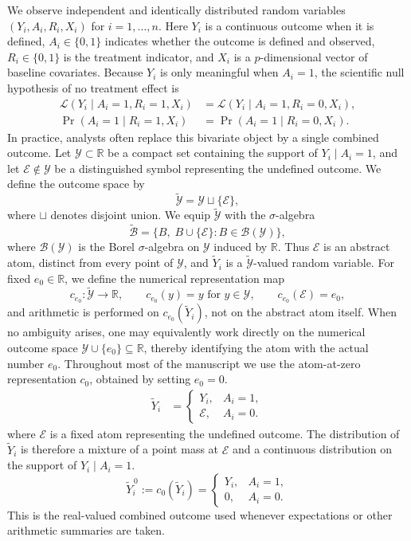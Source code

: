 \documentclass[11pt]{article}
\begin{document}
We observe independent and identically distributed random variables $(Y_i, A_i, R_i, X_i)$ for $i = 1, \ldots, n$. Here $Y_i$ is a continuous outcome when it is defined, $A_i \in \{0,1\}$ indicates whether the outcome is defined and observed, $R_i \in \{0,1\}$ is the treatment indicator, and $X_i$ is a $p$-dimensional vector of baseline covariates. Because $Y_i$ is only meaningful when $A_i = 1$, the scientific null hypothesis of no treatment effect is
\begin{align*}
  \mathcal{L}(Y_i \mid A_i = 1, R_i = 1, X_i)
  &= \mathcal{L}(Y_i \mid A_i = 1, R_i = 0, X_i),\\
  \Pr(A_i = 1 \mid R_i = 1, X_i)
  &= \Pr(A_i = 1 \mid R_i = 0, X_i).
\end{align*}
In practice, analysts often replace this bivariate object by a single combined outcome. Let $\mathcal{Y} \subset \mathbb{R}$ be a compact set containing the support of $Y_i \mid A_i = 1$, and let $\mathcal{E} \notin \mathcal{Y}$ be a distinguished symbol representing the undefined outcome. We define the outcome space by
\[
  \widetilde{\mathcal{Y}} = \mathcal{Y} \sqcup \{\mathcal{E}\},
\]
where $\sqcup$ denotes disjoint union. We equip $\widetilde{\mathcal{Y}}$ with the $\sigma$-algebra
\[
  \widetilde{\mathcal{B}} = \{B,\; B \cup \{\mathcal{E}\} : B \in \mathcal{B}(\mathcal{Y})\},
\]
where $\mathcal{B}(\mathcal{Y})$ is the Borel $\sigma$-algebra on $\mathcal{Y}$ induced by $\mathbb{R}$. Thus $\mathcal{E}$ is an abstract atom, distinct from every point of $\mathcal{Y}$, and $\widetilde{Y}_i$ is a $\widetilde{\mathcal{Y}}$-valued random variable. For fixed $e_0 \in \mathbb{R}$, we define the numerical representation map
\[
  c_{e_0}:\widetilde{\mathcal{Y}} \to \mathbb{R}, \qquad c_{e_0}(y)=y \text{ for } y \in \mathcal{Y}, \qquad c_{e_0}(\mathcal{E}) = e_0,
\]
and arithmetic is performed on $c_{e_0}(\widetilde{Y}_i)$, not on the abstract atom itself. When no ambiguity arises, one may equivalently work directly on the numerical outcome space $\mathcal{Y} \cup \{e_0\} \subseteq \mathbb{R}$, thereby identifying the atom with the actual number $e_0$. Throughout most of the manuscript we use the atom-at-zero representation $c_0$, obtained by setting $e_0 = 0$.
\begin{align}
  \widetilde{Y}_i
  &=
  \begin{cases}
    Y_i, & A_i = 1,\\
    \mathcal{E}, & A_i = 0.
  \end{cases}\label{eq:combinedOutcome}
\end{align}
where $\mathcal{E}$ is a fixed atom representing the undefined outcome. The distribution of $\widetilde{Y}_i$ is therefore a mixture of a point mass at $\mathcal{E}$ and a continuous distribution on the support of $Y_i \mid A_i = 1$.
\[
  \widetilde{Y}_i^{\,0} := c_0(\widetilde{Y}_i)
  =
  \begin{cases}
    Y_i, & A_i = 1,\\
    0, & A_i = 0.
  \end{cases}
\]
This is the real-valued combined outcome used whenever expectations or other arithmetic summaries are taken.
\end{document}
